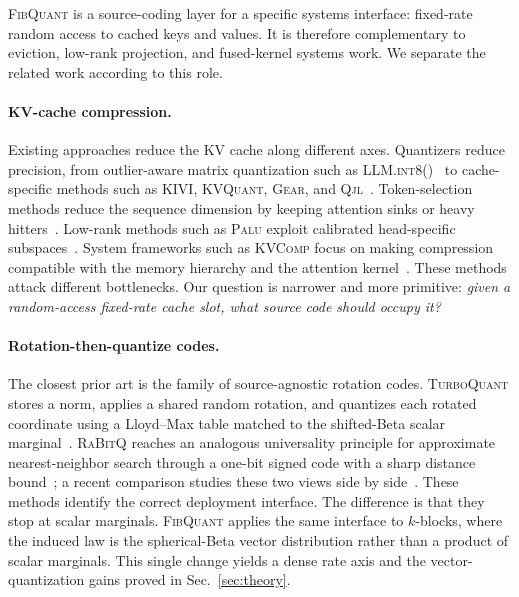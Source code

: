 \documentclass{article}
\theoremstyle{definition}
\theoremstyle{remark}
\begin{document}
\textsc{FibQuant} is a source-coding layer for a specific systems
interface: fixed-rate random access to cached keys and values.  It
is therefore complementary to eviction, low-rank projection, and
fused-kernel systems work.  We separate the related work according
to this role.

\paragraph{KV-cache compression.}
Existing approaches reduce the KV cache along different axes.
Quantizers reduce precision, from outlier-aware matrix quantization
such as \textsc{LLM.int8()}~\citep{dettmers2022llmint8} to
cache-specific methods such as \textsc{KIVI}, \textsc{KVQuant},
\textsc{Gear}, and \textsc{Qjl}~\citep{liu2024kivi, hooper2024kvquant,
kang2024gear, zandieh2025qjl}.  Token-selection methods reduce the
sequence dimension by keeping attention sinks or heavy
hitters~\citep{xiao2024streamingllm, zhang2023h2o, li2024snapkv,
cai2024pyramidkv}.  Low-rank methods such as \textsc{Palu} exploit
calibrated head-specific subspaces~\citep{chang2024palu}.  System
frameworks such as \textsc{KVComp} focus on making compression
compatible with the memory hierarchy and the attention
kernel~\citep{jiang2025kvcomp}.  These methods attack different
bottlenecks.  Our question is narrower and more primitive:
\emph{given a random-access fixed-rate cache slot, what source code
should occupy it?}

\paragraph{Rotation-then-quantize codes.}
The closest prior art is the family of source-agnostic rotation
codes.  \textsc{TurboQuant} stores a norm, applies a shared random
rotation, and quantizes each rotated coordinate using a Lloyd--Max
table matched to the shifted-Beta scalar
marginal~\citep{zandieh2025turboquant}.  \textsc{RaBitQ} reaches an
analogous universality principle for approximate nearest-neighbor
search through a one-bit signed code with a sharp distance
bound~\citep{gao2024rabitq}; a recent comparison studies these two
views side by side~\citep{revisiting2026rabitq_tq}.  These methods
identify the correct deployment interface.  The difference is that
they stop at scalar marginals.  \textsc{FibQuant} applies the same
interface to $k$-blocks, where the induced law is the
spherical-Beta vector distribution rather than a product of scalar
marginals.  This single change yields a dense rate axis and the
vector-quantization gains proved in Sec.~\ref{sec:theory}.
\end{document}
